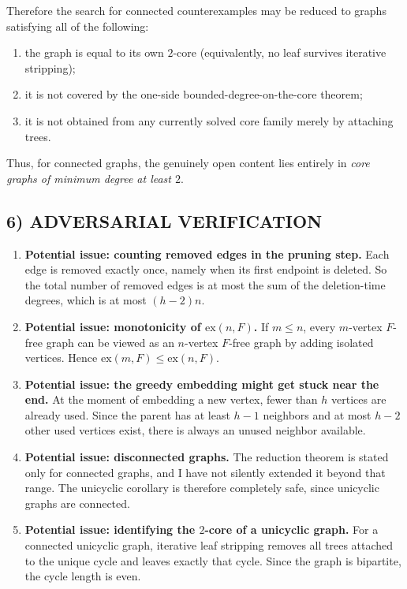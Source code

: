 Therefore the search for connected counterexamples may be reduced to graphs satisfying all of the
following:

\begin{enumerate}
\item the graph is equal to its own $2$-core (equivalently, no leaf survives iterative stripping);
\item it is not covered by the one-side bounded-degree-on-the-core theorem;
\item it is not obtained from any currently solved core family merely by attaching trees.
\end{enumerate}

Thus, for connected graphs, the genuinely open content lies entirely in \emph{core graphs of minimum
degree at least $2$}.

\subsection*{6) ADVERSARIAL VERIFICATION}

\begin{enumerate}
\item \textbf{Potential issue: counting removed edges in the pruning step.}
Each edge is removed exactly once, namely when its first endpoint is deleted. So the total number
of removed edges is at most the sum of the deletion-time degrees, which is at most $(h-2)n$.
\item \textbf{Potential issue: monotonicity of $\mathrm{ex}(n,F)$.}
If $m\le n$, every $m$-vertex $F$-free graph can be viewed as an $n$-vertex $F$-free graph by
adding isolated vertices. Hence $\mathrm{ex}(m,F)\le \mathrm{ex}(n,F)$.
\item \textbf{Potential issue: the greedy embedding might get stuck near the end.}
At the moment of embedding a new vertex, fewer than $h$ vertices are already used. Since the parent
has at least $h-1$ neighbors and at most $h-2$ other used vertices exist, there is always an unused
neighbor available.
\item \textbf{Potential issue: disconnected graphs.}
The reduction theorem is stated only for connected graphs, and I have not silently extended it beyond
that range. The unicyclic corollary is therefore completely safe, since unicyclic graphs are connected.
\item \textbf{Potential issue: identifying the $2$-core of a unicyclic graph.}
For a connected unicyclic graph, iterative leaf stripping removes all trees attached to the unique cycle
and leaves exactly that cycle. Since the graph is bipartite, the cycle length is even.
\end{enumerate}

